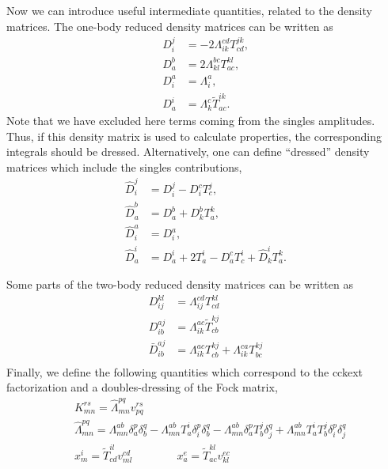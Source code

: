 \documentclass[a4paper,12pt,oneside]{book}
\begin{document}
Now we can introduce useful intermediate quantities, related to the density matrices.
The one-body reduced density matrices can be written as
\begin{equation}
\begin{aligned}
  D_i^j &= -2 \Lambda_{ik}^{cd} T^{jk}_{cd}, \\
  D_a^b &= 2 \Lambda_{kl}^{bc} T^{kl}_{ac}, \\
  D_i^a &= \Lambda_i^a,\\
  D_a^i &= \Lambda_k^c \tilde T^{ik}_{ac}.
\end{aligned}
\end{equation}  
Note that we have excluded here terms coming from the singles amplitudes.
Thus, if this density matrix is used to calculate properties, the corresponding integrals should be dressed.
Alternatively, one can define ``dressed'' density matrices which include the singles contributions,
\begin{equation}
\begin{aligned}
  \hat D_i^j &= D_i^j - D_i^c T^j_c, \\
  \hat D_a^b &= D_a^b + D_k^b T^k_a, \\
  \hat D_i^a &= D_i^a,\\
  \hat D_a^i &= D_a^i + 2T^i_a - D_a^c T^i_c + \hat D_k^i T^k_a.
\end{aligned}
\end{equation}  

Some parts of the two-body reduced density matrices can be written as
\begin{equation}
\begin{aligned}
D_{ij}^{kl} &= \Lambda_{ij}^{cd} T^{kl}_{cd} \\
D_{ib}^{aj} &= \Lambda_{ik}^{ac} \tilde T^{kj}_{cb} \\
\bar D_{ib}^{aj} &= \Lambda_{ik}^{ac} T^{kj}_{cb} + \Lambda_{ik}^{ca} T^{kj}_{bc} \\
\end{aligned}
\end{equation}
Finally, we define the following quantities which correspond to the \textsf{cckext}
factorization and a doubles-dressing of the Fock matrix,
\begin{equation}
\begin{aligned}
&K_{mn}^{rs} = \hat \Lambda_{mn}^{pq} v_{pq}^{rs} \\
&\hat \Lambda_{mn}^{pq} = Λ_{mn}^{ab}\delta_a^p\delta_b^q 
- Λ_{mn}^{ab} T^i_a  \delta_i^p \delta_b^q
- Λ_{mn}^{ab} \delta_a^p T^j_b \delta_j^q
+ Λ_{mn}^{ab} T^i_a T^j_b \delta_i^p \delta_j^q\\
&x_m^i = \tilde T^{il}_{cd} v_{ml}^{cd} \qquad\qquad
x_a^e = \tilde T^{kl}_{ac} v_{kl}^{ec}\\
\end{aligned}
\end{equation}
\end{document}
